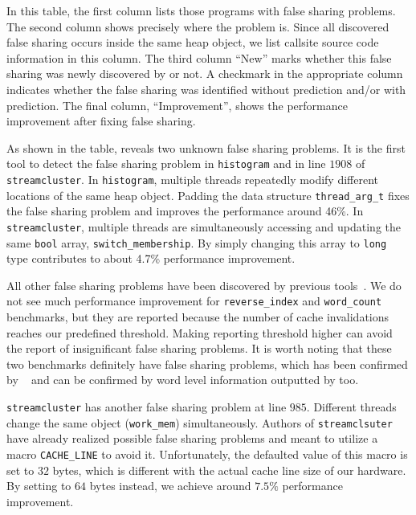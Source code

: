 In this table, the first column lists those programs with false sharing problems.  The second column shows precisely where the problem is. Since all discovered false sharing occurs inside the same heap object, we list callsite source code information in this column.  The third column ``New'' marks whether this false sharing was newly
discovered by \Predator{} or not.  A checkmark in the appropriate
column indicates whether the false sharing was identified without
prediction and/or with prediction.  The final column, ``Improvement'',
shows the performance improvement after fixing false sharing.

As shown in the table, \Predator{} reveals two unknown false sharing problems. 
It is the first tool to detect the false sharing problem in \texttt{histogram} 
and in line $1908$ of \texttt{streamcluster}. 
In \texttt{histogram}, multiple threads repeatedly modify different locations of the same heap object. 
Padding the data structure \texttt{thread\_arg\_t} fixes the false sharing problem and improves the performance around 46\%. In \texttt{streamcluster}, multiple threads are simultaneously accessing and updating the same \texttt{bool} array, \texttt{switch\_membership}. By simply changing this array to \texttt{long} type contributes to about 4.7\% performance improvement.

All other false sharing problems have been discovered by previous tools~\cite{sheriff}. We do not see much performance improvement for \texttt{reverse\_index} and \texttt{word\_count} benchmarks, but they are reported because the number of cache invalidations 
reaches our predefined threshold.
Making reporting threshold higher can avoid the report of insignificant false sharing problems.
It is worth noting that these two benchmarks definitely have false sharing problems,
which has been confirmed by \Sheriff~\cite{sheriff} and can be confirmed by word level information outputted by \Predator{} too. 

\texttt{streamcluster} has another false sharing problem at line $985$. Different threads change the same object (\texttt{work\_mem}) simultaneously. Authors of \texttt{streamclsuter} have already realized possible false sharing problems and meant to utilize a macro \texttt{CACHE\_LINE} to avoid it. Unfortunately, the defaulted value of this macro is set to $32$ bytes, which is different with the actual cache line size of our hardware. By setting to $64$ bytes instead, we achieve around $7.5\%$ performance improvement.

